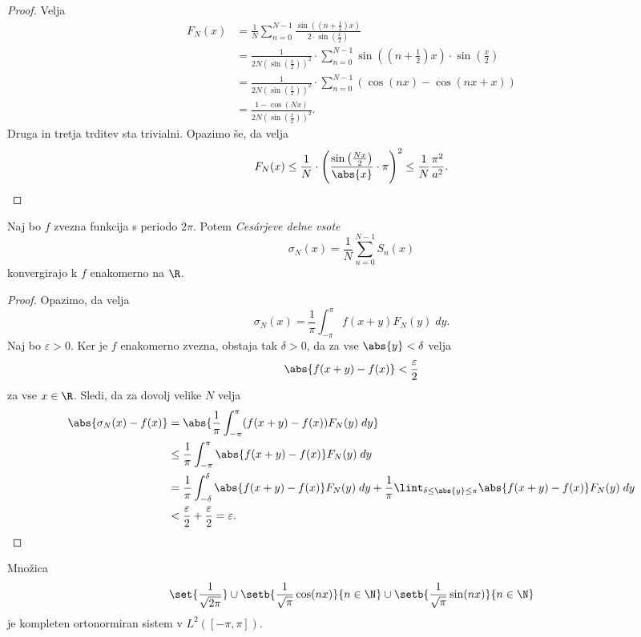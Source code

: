 \begin{proof}
Velja
\begin{align*}
F_N(x) &= \frac{1}{N} \sum_{n=0}^{N-1}
\frac{\sin\left(\left(n + \frac{1}{2}\right)x\right)}
{2 \cdot \sin\left(\frac{x}{2}\right)}
\\
&=
\frac{1}{2N \left(\sin\left(\frac{x}{2}\right)\right)^2} \cdot
\sum_{n=0}^{N-1} \sin\left(\left(n + \frac{1}{2}\right)x\right)
\cdot \sin\left(\frac{x}{2}\right)
\\
&=
\frac{1}{2N \left(\sin\left(\frac{x}{2}\right)\right)^2} \cdot
\sum_{n=0}^{N-1} \left(\cos(nx)-\cos(nx+x)\right)
\\
&=
\frac{1-\cos(Nx)}{2N\left(\sin\left(\frac{x}{2}\right)\right)^2}.
\end{align*}
Druga in tretja trditev sta trivialni. Opazimo še, da velja
\[
F_N(x) \leq
\frac{1}{N} \cdot \left(\frac
{\sin\left(\frac{Nx}{2}\right)}
{\abs{x}}\cdot \pi\right)^2 \leq
\frac{1}{N} \frac{\pi^2}{a^2}. \qedhere
\]
\end{proof}

\begin{izrek}
Naj bo $f$ zvezna funkcija s periodo $2\pi$. Potem \emph{Cesárjeve
delne vsote}
\[
\sigma_N(x) = \frac{1}{N} \sum_{n=0}^{N-1} S_n(x)
\]
konvergirajo k $f$ enakomerno na $\R$.
\end{izrek}

\begin{proof}
Opazimo, da velja
\[
\sigma_N(x) = \frac{1}{\pi} \int_{-\pi}^\pi f(x+y) F_N(y)\;dy.
\]
Naj bo $\varepsilon >0$. Ker je $f$ enakomerno zvezna, obstaja tak
$\delta > 0$, da za vse $\abs{y} < \delta$ velja
\[
\abs{f(x+y) - f(x)} < \frac{\varepsilon}{2}
\]
za vse $x \in \R$. Sledi, da za dovolj velike $N$ velja
\begin{align*}
\abs{\sigma_N(x) - f(x)} &=
\abs{\frac{1}{\pi} \int_{-\pi}^\pi (f(x+y) - f(x)) F_N(y)\;dy}
\\
&\leq
\frac{1}{\pi} \int_{-\pi}^\pi \abs{f(x+y) - f(x)} F_N(y)\;dy
\\
&=
\frac{1}{\pi} \int_{-\delta}^\delta \abs{f(x+y) - f(x)} F_N(y)\;dy
+ \frac{1}{\pi} \lint_{\delta \leq \abs{y} \leq \pi}
\abs{f(x+y) - f(x)} F_N(y)\;dy
\\
&< \frac{\varepsilon}{2} + \frac{\varepsilon}{2} =
\varepsilon. \qedhere
\end{align*}
\end{proof}

\begin{posledica}
Množica
\[
\set{\frac{1}{\sqrt{2\pi}}} \cup
\setb{\frac{1}{\sqrt{\pi}} \cos(nx)}{n \in \N} \cup
\setb{\frac{1}{\sqrt{\pi}} \sin(nx)}{n \in \N}
\]
je kompleten ortonormiran sistem v $L^2([-\pi,\pi])$.
\end{posledica}

